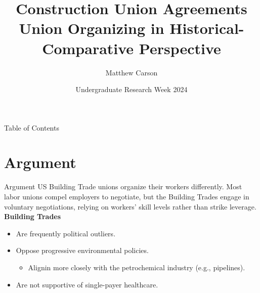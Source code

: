 \documentclass{beamer}
\title[Construction Union\ldots{Historical-Comparative}]{Construction Union Agreements\\
Union Organizing in Historical-Comparative Perspective}
\author{Matthew Carson}
\date[Undergraduate Research Week '24]{Undergraduate Research Week 2024}
\begin{document}
\begin{frame}
  \titlepage
\end{frame}

\begin{frame}{Table of Contents}
  \tableofcontents
\end{frame}

\section{Argument}
\begin{frame}{Argument}
	US Building Trade unions organize their workers differently. Most labor unions compel employers to negotiate, but the Building Trades engage in voluntary negotiations, relying on workers' skill levels rather than strike leverage. 
	\newline\newline
	\textbf{Building Trades}
	\begin{itemize}
		\item Are frequently political outliers.
		\item Oppose progressive environmental policies.
		\begin{itemize}
			\item Alignin more closely with the petrochemical industry (e.g., pipelines).
		\end{itemize}
		\item Are not supportive of single-payer healthcare.
	\end{itemize}
	
\end{frame}
\end{document}
